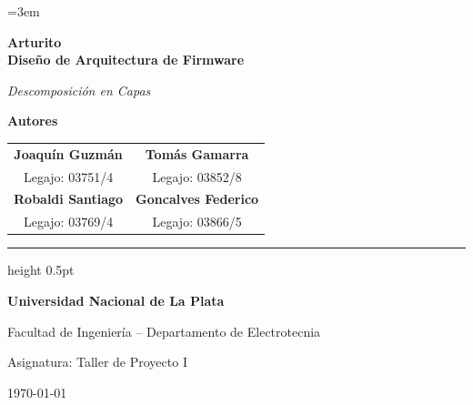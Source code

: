 \documentclass[12pt,a4paper]{article}
\begin{document}
\emergencystretch=3em

\begin{titlepage}
    \thispagestyle{empty}
    \centering
    \vspace*{1.5cm}

    {\huge \bfseries Arturito\\[0.3em] Diseño de Arquitectura de Firmware \par}
    \vspace{0.5cm}
    {\Large \textit{Descomposición en Capas} \par}

    \vfill

    {\Large \bfseries Autores \par}
    \vspace{0.6cm}
    \begin{tabular}{c c}
        \textbf{Joaquín Guzmán} & \textbf{Tomás Gamarra} \\
        \small Legajo: 03751/4 & \small Legajo: 03852/8 \\[1.5em]
        \textbf{Robaldi Santiago} & \textbf{Goncalves Federico} \\
        \small Legajo: 03769/4 & \small Legajo: 03866/5
    \end{tabular}

    \vspace{1.5cm}
    \hrule height 0.5pt
    \vspace{0.4cm}

    {\large \textbf{Universidad Nacional de La Plata}} \par
    \vspace{0.15cm}
    {Facultad de Ingeniería -- Departamento de Electrotecnia} \par
    \vspace{0.15cm}
    {\small Asignatura: Taller de Proyecto I} \par
    \vspace{0.3cm}
    {\small \today}
\end{titlepage}

\newpage

\end{document}
